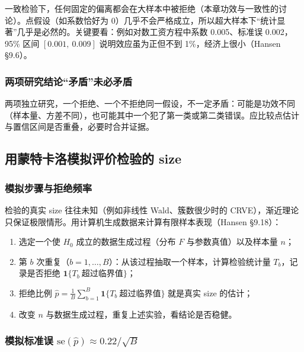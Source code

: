 一致检验下，任何固定的偏离都会在大样本中被拒绝（本章功效与一致性的讨论）。点假设（如系数恰好为 0）几乎不会严格成立，所以超大样本下“统计显著”几乎是必然的。关键要看：例如对数工资方程中系数 0.005、标准误 0.002，95\% 区间 $[0.001,\ 0.009]$ 说明效应虽为正但不到 1\%，经济上很小（Hansen §9.6）。

\subsubsection{两项研究结论“矛盾”未必矛盾}

两项独立研究，一个拒绝、一个不拒绝同一假设，不一定矛盾：可能是功效不同（样本量、方差不同），也可能其中一个犯了第一类或第二类错误。应比较点估计与置信区间是否重叠，必要时合并证据。

\subsection{用蒙特卡洛模拟评价检验的 size}

\subsubsection{模拟步骤与拒绝频率}

检验的真实 size 往往未知（例如非线性 Wald、簇数很少时的 CRVE），渐近理论只保证极限情形。用计算机生成数据来计算有限样本表现（Hansen §9.18）：

\begin{method}
\begin{enumerate}
  \item 选定一个使 $H_0$ 成立的数据生成过程（分布 $F$ 与参数真值）以及样本量 $n$；
  \item 第 $b$ 次重复（$b=1,\dots,B$）：从该过程抽取一个样本，计算检验统计量 $T_b$，记录是否拒绝 $\mathbf 1\{T_b\ \text{超过临界值}\}$；
  \item 拒绝比例 $\hat p=\frac1B\sum_{b=1}^B\mathbf 1\{T_b\ \text{超过临界值}\}$ 就是真实 size 的估计；
  \item 改变 $n$ 与数据生成过程，重复上述实验，看结论是否稳健。
\end{enumerate}
\end{method}

\subsubsection{模拟标准误 \texorpdfstring{$\mathrm{se}(\hat p)\approx0.22/\sqrt B$}{se(p-hat) = 0.22/sqrt(B)}}

